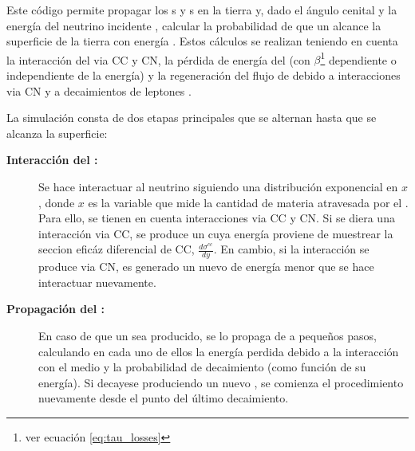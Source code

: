 	Este c\'odigo permite propagar los \nutau{}s y \tauon{}s en la tierra y, dado el \'angulo cenital \tita{} y la energ\'ia del neutrino incidente \enu{}, calcular la probabilidad de que un \tauon{} alcance la superficie de la tierra con energ\'ia \etau{}.
	Estos c\'alculos se realizan teniendo en cuenta la interacci\'on del \nutau{} via CC y CN, la p\'erdida de energ\'ia del \tauon{} (con $\beta$\footnote{ver ecuaci\'on \ref{eq:tau_losses}} dependiente o independiente de la energ\'ia) y la regeneraci\'on del flujo de \nutau{} debido a interacciones via CN y a decaimientos de leptones \tauon{}.
	
	La simulaci\'on consta de dos etapas principales que se alternan hasta que se alcanza la superficie:
	
	\begin{description}
	\item[\textbf{Interacci\'on del \nutau{}:}] Se hace interactuar al neutrino siguiendo una distribuci\'on exponencial en $x$, donde $x$ es la variable que mide la cantidad de materia atravesada por el \nutau{}. Para ello, se tienen en cuenta interacciones via CC y CN. Si se diera una interacci\'on via CC, se produce un \tauon{} cuya energ\'ia proviene de muestrear la seccion efic\'az diferencial de CC, $\frac{d\sigma^{cc}}{dy}$. En cambio, si la interacci\'on se produce via CN, es generado un nuevo \nutau{} de energ\'ia menor que se hace interactuar nuevamente.
	\item[\textbf{Propagaci\'on del \tauon{}:}] En caso de que un \tauon{} sea producido, se lo propaga de a peque\~nos pasos, calculando en cada uno de ellos la energ\'ia perdida debido a la interacci\'on con el medio y la probabilidad de decaimiento (como funci\'on de su energ\'ia). Si decayese produciendo un nuevo \nutau{}, se comienza el procedimiento nuevamente desde el punto del \'ultimo decaimiento.
	\end{description}
	
